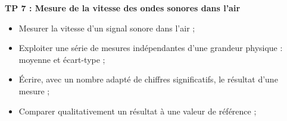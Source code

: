
\renewcommand{\thesection}{\textcolor{red}{Partie \Roman{section} -}}
\renewcommand{\thesubsection}{\textcolor{red}{\Roman{section}.\arabic{subsection}}}
\renewcommand{\thesubsubsection}{\textcolor{red}{\Roman{section}.\arabic{subsection}.\alph{subsubsection}}}

\setcounter{section}{0}
\setcounter{document}{0}
\sndEnTeteTPSept

\begin{center}
\begin{mdframed}[style=titr, leftmargin=60pt, rightmargin=60pt, innertopmargin=7pt, innerbottommargin=7pt, innerrightmargin=8pt, innerleftmargin=8pt]

\begin{center}
\large{\textbf{TP 7 : Mesure de la vitesse des ondes sonores dans l'air
}}
\end{center}
\end{mdframed}
\end{center}



\begin{tcolorbox}[colback=blue!5!white,colframe=blue!75!black,title=Objectifs de la séance :]
\begin{itemize}
    \item Mesurer la vitesse d’un signal sonore dans l'air ;
    \item Exploiter une série de mesures indépendantes d’une grandeur physique : moyenne et écart-type ;
    \item Écrire, avec un nombre adapté de chiffres significatifs, le résultat d’une mesure ;
    \item Comparer qualitativement un résultat à une valeur de référence ;
\end{itemize}
\end{tcolorbox}

